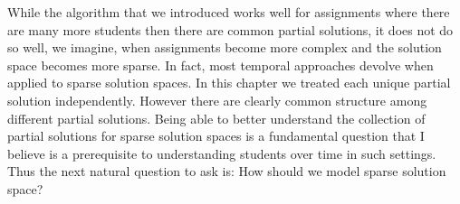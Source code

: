 While the algorithm that we introduced works well for assignments where there are many more students then there are common partial solutions, it does not do so well, we imagine, when assignments become more complex and the solution space becomes more sparse. In fact, most temporal approaches devolve when applied to sparse solution spaces. In this chapter we treated each unique partial solution independently. However there are clearly common structure among different partial solutions. Being able to better understand the collection of partial solutions for sparse solution spaces is a fundamental question that I believe is a prerequisite to understanding students over time in such settings. Thus the next natural question to ask is: How should we model sparse solution space?